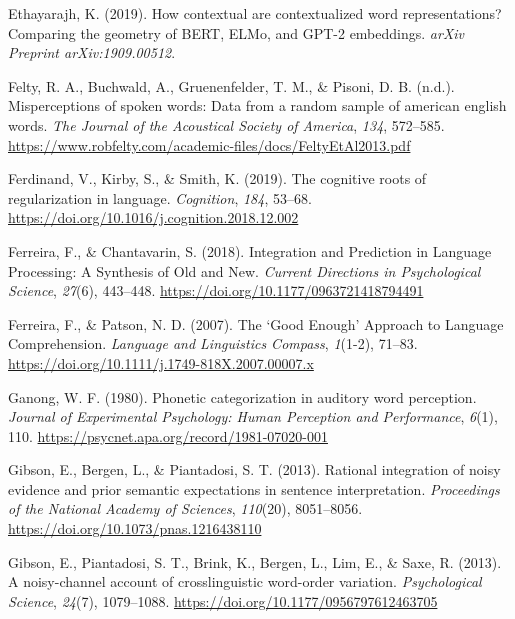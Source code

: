 \documentclass[
  12pt,
  letterpaper,
]{scrreport}
\newlength{\cslhangindent}
\newenvironment{CSLReferences}[2] %
 {\begin{list}{}{%
  \setlength{\itemindent}{0pt}
  \setlength{\leftmargin}{0pt}
  \setlength{\parsep}{0pt}
  \ifodd #1
   \setlength{\leftmargin}{\cslhangindent}
   \setlength{\itemindent}{-1\cslhangindent}
  \fi
  \setlength{\itemsep}{#2\baselineskip}}}
 {\end{list}}
\begin{document}
\begin{CSLReferences}{1}{0}
Ethayarajh, K. (2019). How contextual are contextualized word
representations? Comparing the geometry of BERT, ELMo, and GPT-2
embeddings. \emph{arXiv Preprint arXiv:1909.00512}.

Felty, R. A., Buchwald, A., Gruenenfelder, T. M., \& Pisoni, D. B.
(n.d.). Misperceptions of spoken words: Data from a random sample of
american english words. \emph{The Journal of the Acoustical Society of
America}, \emph{134}, 572--585.
\url{https://www.robfelty.com/academic-files/docs/FeltyEtAl2013.pdf}

Ferdinand, V., Kirby, S., \& Smith, K. (2019). The cognitive roots of
regularization in language. \emph{Cognition}, \emph{184}, 53--68.
\url{https://doi.org/10.1016/j.cognition.2018.12.002}

Ferreira, F., \& Chantavarin, S. (2018). Integration and Prediction in
Language Processing: A Synthesis of Old and New. \emph{Current
Directions in Psychological Science}, \emph{27}(6), 443--448.
\url{https://doi.org/10.1177/0963721418794491}

Ferreira, F., \& Patson, N. D. (2007). The {`}Good Enough{'} Approach to
Language Comprehension. \emph{Language and Linguistics Compass},
\emph{1}(1-2), 71--83.
\url{https://doi.org/10.1111/j.1749-818X.2007.00007.x}

Ganong, W. F. (1980). Phonetic categorization in auditory word
perception. \emph{Journal of Experimental Psychology: Human Perception
and Performance}, \emph{6}(1), 110.
\url{https://psycnet.apa.org/record/1981-07020-001}

Gibson, E., Bergen, L., \& Piantadosi, S. T. (2013). Rational
integration of noisy evidence and prior semantic expectations in
sentence interpretation. \emph{Proceedings of the National Academy of
Sciences}, \emph{110}(20), 8051--8056.
\url{https://doi.org/10.1073/pnas.1216438110}

Gibson, E., Piantadosi, S. T., Brink, K., Bergen, L., Lim, E., \& Saxe,
R. (2013). A noisy-channel account of crosslinguistic word-order
variation. \emph{Psychological Science}, \emph{24}(7), 1079--1088.
\url{https://doi.org/10.1177/0956797612463705}


\end{CSLReferences}
\end{document}
